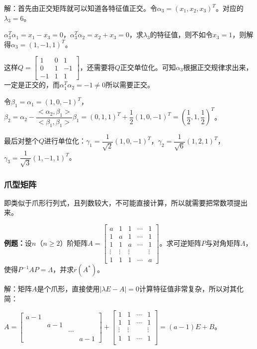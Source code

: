 解：首先由正交矩阵就可以知道各特征值正交。令$\alpha_3=(x_1,x_2,x_3)^T$。对应的$\lambda_3=6$。

$\alpha_3^T\alpha_1=x_1-x_3=0$，$\alpha_3^T\alpha_2=x_2+x_3=0$，求$\lambda_3$的特征值，则不如令$x_3=1$，则解得$\alpha_3=(1,-1,1)^T$。

这样$Q=\left[\begin{array}{ccc}
    1 & 0 & 1 \\
    0 & 1 & -1 \\
    -1 & 1 & 1
\end{array}\right]$，还需要将$Q$正交单位化。可知$\alpha_3$根据正交规律求出来，一定是正交的，而$\alpha_1^T\alpha_2=-1\neq0$所以需要正交。

令$\beta_1=\alpha_1=(1,0,-1)^T$，$\beta_2=\alpha_2-\dfrac{<\alpha_2,\beta_1>}{<\beta_1,\beta_1>}\beta_1=(0,1,1)^T+\dfrac{1}{2}(1,0,-1)^T=(\dfrac{1}{2},1,\dfrac{1}{2})^T$。

最后对整个$Q$进行单位化：$\gamma_1=\dfrac{1}{\sqrt{2}}(1,0,-1)^T$，$\gamma_2=\dfrac{1}{\sqrt{6}}(1,2,1)^T$，$\gamma_3=\dfrac{1}{\sqrt{3}}(1,-1,1)^T$。

\subsubsection{爪型矩阵}

即类似于爪形行列式，且列数较大，不可能直接计算，所以就需要把常数项提出来。

\textbf{例题：}设$n$（$n\geqslant2$）阶矩阵$A=\left[\begin{array}{ccccc}
    a & 1 & 1 & \cdots & 1 \\
    1 & a & 1 & \cdots & 1 \\
    1 & 1 & a & \cdots & 1 \\
    \vdots & \vdots & \vdots &  & \vdots \\
    1 & 1 & 1 & \cdots & a
\end{array}\right]$。求可逆矩阵$P$与对角矩阵$\Lambda$，使得$P^{-1}AP=\Lambda$，并求$r(A^*)$。

解：矩阵$A$是个爪形，直接使用$\vert\lambda E-A\vert=0$计算特征值非常复杂，所以对其化简：

$A=\left[\begin{array}{cccc}
    a-1 \\
    & a-1 \\
    & & \cdots \\
    & & & a-1
\end{array}\right]+\left[\begin{array}{cccc}
    1 & 1 & \cdots & 1 \\
    1 & 1 & \cdots & 1 \\
    \vdots & \vdots & & \vdots \\
    1 & 1 & \cdots & 1 \\
\end{array}\right]=(a-1)E+B$。

